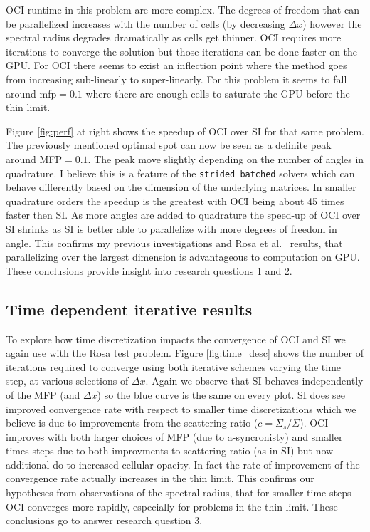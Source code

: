 OCI runtime in this problem are more complex.
The degrees of freedom that can be parallelized increases with the number of cells (by decreasing $\Delta x$) however the spectral radius degrades dramatically as cells get thinner.
OCI requires more iterations to converge the solution but those iterations can be done faster on the GPU.
For OCI there seems to exist an inflection point where the method goes from increasing sub-linearly to super-linearly.
For this problem it seems to fall around mfp$=0.1$ where there are enough cells to saturate the GPU before the thin limit.

Figure \ref{fig:perf} at right shows the speedup of OCI over SI for that same problem. 
The previously mentioned optimal spot can now be seen as a definite peak around MFP$=0.1$.
The peak move slightly depending on the number of angles in quadrature.
I believe this is a feature of the \texttt{strided\_batched} solvers which can behave differently based on the dimension of the underlying matrices\cite{rocsolver}.
In smaller quadrature orders the speedup is the greatest with OCI being about 45 times faster then SI.
As more angles are added to quadrature the speed-up of OCI over SI shrinks as SI is better able to parallelize with more degrees of freedom in angle.
This confirms my previous investigations \cite{morgan2023oci} and Rosa et al.~\cite{rosa_cellwise_2013} results, that parallelizing over the largest dimension is advantageous to computation on GPU.
These conclusions provide insight into research questions 1 and 2.

\subsection{Time dependent iterative results}

To explore how time discretization impacts the convergence of OCI and SI we again use with the Rosa test problem.
Figure \ref{fig:time_desc} shows the number of iterations required to converge using both iterative schemes varying the time step, at various selections of $\Delta x$.
Again we observe that SI behaves independently of the MFP (and $\Delta x$) so the blue curve is the same on every plot.
SI does see improved convergence rate with respect to smaller time discretizations which we believe is due to improvements from the scattering ratio ($c=\Sigma_s/\Sigma$).
OCI improves with both larger choices of MFP (due to a-syncronisty) and smaller times steps due to both improvments to scattering ratio (as in SI) but now additional do to increased cellular opacity.
In fact the rate of improvement of the convergence rate actually increases in the thin limit.
This confirms our hypotheses from observations of the spectral radius, that for smaller time steps OCI converges more rapidly, especially for problems in the thin limit.
These conclusions go to answer research question 3.

